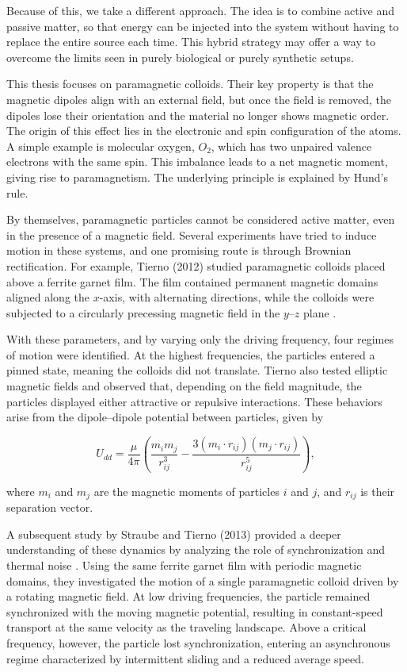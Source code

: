 Because of this, we take a different approach. The idea is to combine active and passive matter, so that energy can be injected into the system without having to replace the entire source each time. This hybrid strategy may offer a way to overcome the limits seen in purely biological or purely synthetic setups.

This thesis focuses on paramagnetic colloids. Their key property is that the magnetic dipoles align with an external field, but once the field is removed, the dipoles lose their orientation and the material no longer shows magnetic order. The origin of this effect lies in the electronic and spin configuration of the atoms. A simple example is molecular oxygen, $O_2$, which has two unpaired valence electrons with the same spin. This imbalance leads to a net magnetic moment, giving rise to paramagnetism. The underlying principle is explained by Hund’s rule.

By themselves, paramagnetic particles cannot be considered active matter, even in the presence of a magnetic field. Several experiments have tried to induce motion in these systems, and one promising route is through Brownian rectification. For example, Tierno (2012) studied paramagnetic colloids placed above a ferrite garnet film. The film contained permanent magnetic domains aligned along the $x$-axis, with alternating directions, while the colloids were subjected to a circularly precessing magnetic field in the $y$–$z$ plane \cite{tierno2012depinning}.

With these parameters, and by varying only the driving frequency, four regimes of motion were identified. At the highest frequencies, the particles entered a pinned state, meaning the colloids did not translate. Tierno also tested elliptic magnetic fields and observed that, depending on the field magnitude, the particles displayed either attractive or repulsive interactions. These behaviors arise from the dipole–dipole potential between particles, given by

\begin{equation}
U_{dd} = \frac{\mu}{4\pi} \left( \frac{m_i m_j}{r^3_{ij}} - \frac{3(m_i \cdot r_{ij})(m_j \cdot r_{ij})}{r^5_{ij}} \right),
\label{eq:dipolepairpotential}
\end{equation}

where $m_i$ and $m_j$ are the magnetic moments of particles $i$ and $j$, and $r_{ij}$ is their separation vector.

A subsequent study by Straube and Tierno (2013) provided a deeper understanding of these dynamics by analyzing the role of synchronization and thermal noise \cite{straube2013synchronous}. Using the same ferrite garnet film with periodic magnetic domains, they investigated the motion of a single paramagnetic colloid driven by a rotating magnetic field. At low driving frequencies, the particle remained synchronized with the moving magnetic potential, resulting in constant-speed transport at the same velocity as the traveling landscape. Above a critical frequency, however, the particle lost synchronization, entering an asynchronous regime characterized by intermittent sliding and a reduced average speed.

